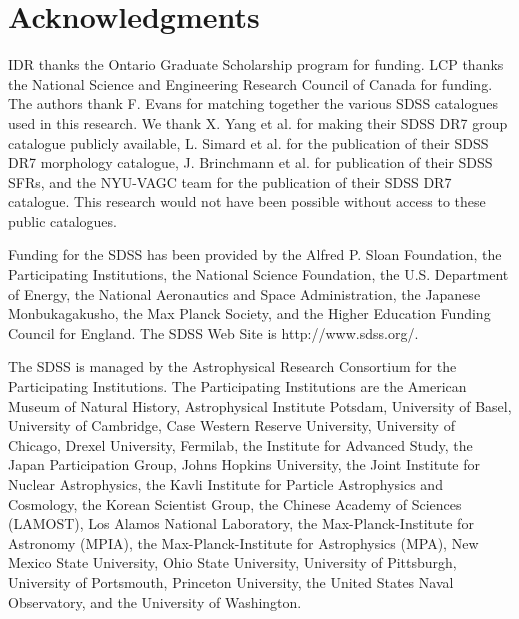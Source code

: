 \documentclass[a4paper,fleqn,usenatbib]{mnras}
\begin{document}

\section*{Acknowledgments}
\label{sec:acknowledgments}

IDR thanks the Ontario Graduate Scholarship program for funding.  LCP
thanks the National Science and Engineering Research
Council of Canada for funding.  The authors thank
F. Evans for matching together the various SDSS catalogues used in
this research.  We thank X. Yang et al. for
making their
SDSS DR7 group catalogue publicly available, L. Simard et al. for the
publication of their SDSS DR7 morphology catalogue, J. Brinchmann et al. for
publication of their SDSS SFRs, and the NYU-VAGC
team for the 
publication of their SDSS DR7 catalogue.  This research would not have
been possible without access to these public catalogues.
\par
Funding for the SDSS has been provided by the Alfred P. Sloan
Foundation, the Participating Institutions, the National Science
Foundation, the U.S. Department of Energy, the National Aeronautics
and Space Administration, the Japanese Monbukagakusho, the Max Planck
Society, and the Higher Education Funding Council for England. The
SDSS Web Site is http://www.sdss.org/.
\par
The SDSS is managed by the Astrophysical Research Consortium for the
Participating Institutions. The Participating Institutions are the
American Museum of Natural History, Astrophysical Institute Potsdam,
University of Basel, University of Cambridge, Case Western Reserve
University, University of Chicago, Drexel University, Fermilab, the
Institute for Advanced Study, the Japan Participation Group, Johns
Hopkins University, the Joint Institute for Nuclear Astrophysics, the
Kavli Institute for Particle Astrophysics and Cosmology, the Korean
Scientist Group, the Chinese Academy of Sciences (LAMOST), Los Alamos
National Laboratory, the Max-Planck-Institute for Astronomy (MPIA),
the Max-Planck-Institute for Astrophysics (MPA), New Mexico State
University, Ohio State University, University of Pittsburgh,
University of Portsmouth, Princeton University, the United States
Naval Observatory, and the University of Washington.



\end{document}
